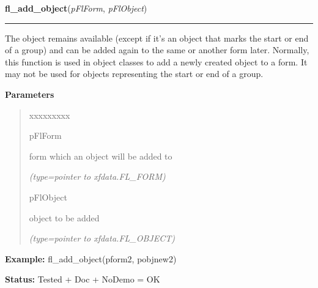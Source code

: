 \hspace{.8\funcindent}\begin{boxedminipage}{\funcwidth}

    \raggedright \textbf{fl\_add\_object}(\textit{pFlForm}, \textit{pFlObject})

    \vspace{-1.5ex}

    \rule{\textwidth}{0.5\fboxrule}
\setlength{\parskip}{2ex}
    The object remains available (except if it's an object that marks the 
    start or end of a group) and can be added again to the same or another 
    form later. Normally, this function is used in object classes to add a 
    newly created object to a form. It may not be used for objects 
    representing the start or end of a group.

\setlength{\parskip}{1ex}
      \textbf{Parameters}
      \vspace{-1ex}

      \begin{quote}
        \begin{Ventry}{xxxxxxxxx}

          \item[pFlForm]

          form which an object will be added to

            {\it (type=pointer to xfdata.FL\_FORM)}

          \item[pFlObject]

          object to be added

            {\it (type=pointer to xfdata.FL\_OBJECT)}

        \end{Ventry}

      \end{quote}

\textbf{Example:} fl\_add\_object(pform2, pobjnew2)



\textbf{Status:} Tested + Doc + NoDemo = OK



    \end{boxedminipage}

    \label{xformslib:flbasic:fl_addto_form}

    \vspace{0.5ex}

